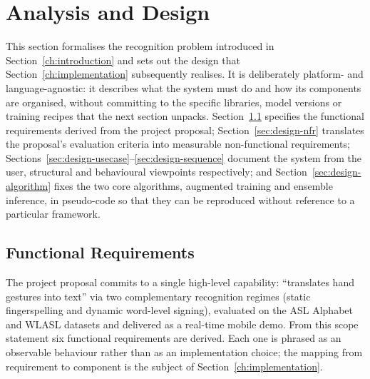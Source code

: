 \chapter{Analysis and Design}
\label{ch:analysis-design}

This section formalises the recognition problem introduced in
Section~\ref{ch:introduction} and sets out the design that
Section~\ref{ch:implementation} subsequently realises. It is
deliberately platform- and language-agnostic: it describes what the
system must do and how its components are organised, without
committing to the specific libraries, model versions or training
recipes that the next section unpacks. Section~\ref{sec:design-fr}
specifies the functional requirements derived from the project
proposal; Section~\ref{sec:design-nfr} translates the proposal's
evaluation criteria into measurable non-functional requirements;
Sections~\ref{sec:design-usecase}--\ref{sec:design-sequence} document
the system from the user, structural and behavioural viewpoints
respectively; and Section~\ref{sec:design-algorithm} fixes the two
core algorithms, augmented training and ensemble inference, in
pseudo-code so that they can be reproduced without reference to a
particular framework.

\section{Functional Requirements}
\label{sec:design-fr}

The project proposal commits to a single high-level capability:
``translates hand gestures into text'' via two complementary
recognition regimes (static fingerspelling and dynamic word-level
signing), evaluated on the ASL Alphabet and WLASL datasets and
delivered as a real-time mobile demo. From this scope statement six
functional requirements are derived. Each one is phrased as an
observable behaviour rather than as an implementation choice; the
mapping from requirement to component is the subject of
Section~\ref{ch:implementation}.

